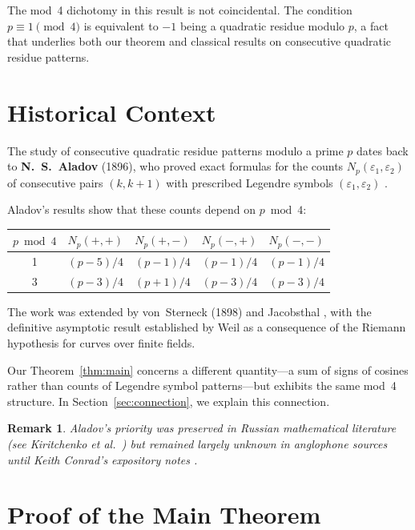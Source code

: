 \documentclass[11pt,a4paper]{article}
\newtheorem{remark}{Remark}
\begin{document}
The mod~4 dichotomy in this result is not coincidental. The condition $p \equiv 1 \pmod 4$ is equivalent to $-1$ being a quadratic residue modulo $p$, a fact that underlies both our theorem and classical results on consecutive quadratic residue patterns.

\section{Historical Context}

The study of consecutive quadratic residue patterns modulo a prime $p$ dates back to \textbf{N.~S.~Aladov} (1896), who proved exact formulas for the counts $N_p(\varepsilon_1, \varepsilon_2)$ of consecutive pairs $(k, k+1)$ with prescribed Legendre symbols $(\varepsilon_1, \varepsilon_2)$ \cite{Aladov1896}.

Aladov's results show that these counts depend on $p \bmod 4$:
\begin{center}
\begin{tabular}{c|cccc}
$p \bmod 4$ & $N_p(+,+)$ & $N_p(+,-)$ & $N_p(-,+)$ & $N_p(-,-)$ \\
\hline
1 & $(p-5)/4$ & $(p-1)/4$ & $(p-1)/4$ & $(p-1)/4$ \\
3 & $(p-3)/4$ & $(p+1)/4$ & $(p-3)/4$ & $(p-3)/4$
\end{tabular}
\end{center}

The work was extended by von~Sterneck (1898) and Jacobsthal \cite{Jacobsthal1906}, with the definitive asymptotic result established by Weil \cite{Weil1948} as a consequence of the Riemann hypothesis for curves over finite fields.

Our Theorem~\ref{thm:main} concerns a different quantity---a sum of signs of cosines rather than counts of Legendre symbol patterns---but exhibits the same mod~4 structure. In Section~\ref{sec:connection}, we explain this connection.

\begin{remark}
Aladov's priority was preserved in Russian mathematical literature (see Kiritchenko et al.\ \cite{KTVZ2024}) but remained largely unknown in anglophone sources until Keith Conrad's expository notes \cite{Conrad}.
\end{remark}

\section{Proof of the Main Theorem}
\end{document}
